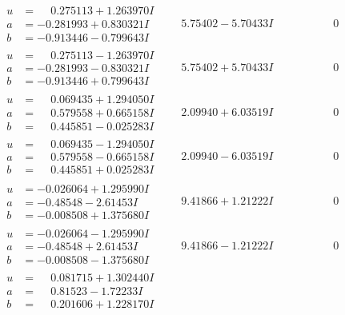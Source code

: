 \documentclass[1p]{elsarticle_modified}
\theoremstyle{definition}
\begin{document}
$$\begin{array}{c|c|c}
\begin{aligned}
u &= \phantom{-}0.275113 + 1.263970 I \\
a &= -0.281993 + 0.830321 I \\
b &= -0.913446 - 0.799643 I\end{aligned}
 & \phantom{-}5.75402 - 5.70433 I & \phantom{-0.000000 } 0 \\ \hline\begin{aligned}
u &= \phantom{-}0.275113 - 1.263970 I \\
a &= -0.281993 - 0.830321 I \\
b &= -0.913446 + 0.799643 I\end{aligned}
 & \phantom{-}5.75402 + 5.70433 I & \phantom{-0.000000 } 0 \\ \hline\begin{aligned}
u &= \phantom{-}0.069435 + 1.294050 I \\
a &= \phantom{-}0.579558 + 0.665158 I \\
b &= \phantom{-}0.445851 - 0.025283 I\end{aligned}
 & \phantom{-}2.09940 + 6.03519 I & \phantom{-0.000000 } 0 \\ \hline\begin{aligned}
u &= \phantom{-}0.069435 - 1.294050 I \\
a &= \phantom{-}0.579558 - 0.665158 I \\
b &= \phantom{-}0.445851 + 0.025283 I\end{aligned}
 & \phantom{-}2.09940 - 6.03519 I & \phantom{-0.000000 } 0 \\ \hline\begin{aligned}
u &= -0.026064 + 1.295990 I \\
a &= -0.48548 - 2.61453 I \\
b &= -0.008508 + 1.375680 I\end{aligned}
 & \phantom{-}9.41866 + 1.21222 I & \phantom{-0.000000 } 0 \\ \hline\begin{aligned}
u &= -0.026064 - 1.295990 I \\
a &= -0.48548 + 2.61453 I \\
b &= -0.008508 - 1.375680 I\end{aligned}
 & \phantom{-}9.41866 - 1.21222 I & \phantom{-0.000000 } 0 \\ \hline\begin{aligned}
u &= \phantom{-}0.081715 + 1.302440 I \\
a &= \phantom{-}0.81523 - 1.72233 I \\
b &= \phantom{-}0.201606 + 1.228170 I\end{aligned}

\end{array}$$
\end{document}
